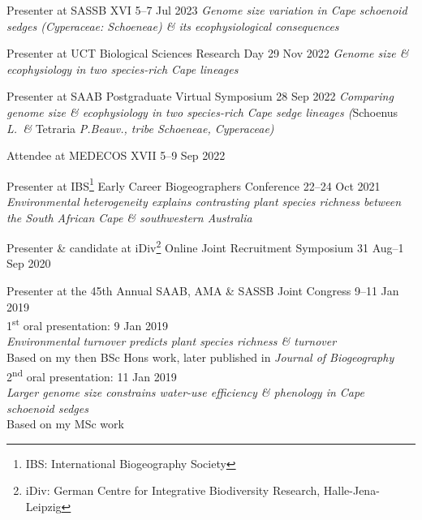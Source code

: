 \documentclass[10pt]{article}
\begin{document}
\begin{hangparas}{2em}{1}

Presenter at SASSB XVI                               \hfill 5--7 Jul 2023 \break
\textit{Genome size variation in Cape schoenoid sedges (Cyperaceae: Schoeneae) \& \break
its ecophysiological consequences}

Presenter at UCT Biological Sciences Research Day      \hfill 29 Nov 2022 \break
\textit{Genome size \& ecophysiology in two species-rich Cape lineages}

Presenter at SAAB Postgraduate Virtual Symposium       \hfill 28 Sep 2022 \break
\textit{Comparing genome size \& ecophysiology in two species-rich Cape sedge lineages \break
(}Schoenus\textit{ L.~\& }Tetraria\textit{ P.Beauv., tribe Schoeneae, Cyperaceae)}

Attendee at MEDECOS XVII                                    \hfill 5--9 Sep 2022

Presenter at IBS\footnote{IBS: International Biogeography Society}
Early Career Biogeographers Conference                    \hfill 22--24 Oct 2021 \break
\textit{Environmental heterogeneity explains contrasting plant species richness between \break
the South African Cape \& southwestern Australia}

Presenter \& candidate at iDiv\footnote{iDiv: German Centre for Integrative
Biodiversity Research, Halle-Jena-Leipzig} Online Joint Recruitment Symposium
                                                       \hfill 31 Aug--1 Sep 2020

Presenter at the 45th Annual SAAB, AMA \& SASSB Joint Congress
                                                        \hfill 9--11 Jan 2019 \\
\hspace{2em} 1\textsuperscript{st} oral presentation:       \hfill 9 Jan 2019 \\
\hspace{4em} \textit{Environmental turnover predicts plant species richness \& 
turnover}                                                                     \\
\hspace{4em} Based on my then BSc Hons work, later published in \textit{Journal
of Biogeography}                                                              \\
\hspace{2em} 2\textsuperscript{nd} oral presentation:      \hfill 11 Jan 2019 \\
\hspace{4em} \textit{Larger genome size constrains water-use efficiency \&
phenology in Cape schoenoid sedges}                                           \\
\hspace{4em} Based on my MSc work


\end{hangparas}
\end{document}
